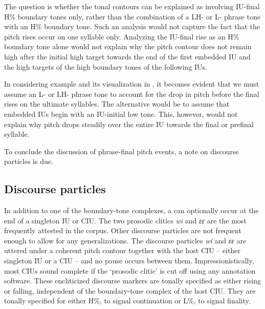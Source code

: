 The question is whether the tonal contours can be explained as involving  IU-final H\% boundary tones only, rather than the combination of a LH- or L- phrase tone with an H\% boundary tone. Such an analysis would not capture the fact that the pitch rises occur on one syllable only. Analyzing the IU-final rise as an H\% boundary tone  alone would not explain why the pitch contour does not remain high after the initial high target towards the end of the first embedded IU and the high targets of the high boundary tones of the following IUs.  

In considering example  and its visualization in  , it becomes evident that we must assume an L- or LH- phrase tone to account for the drop in pitch before the final rises on the ultimate syllables. 
The alternative would be to assume that embedded IUs begin with an IU-initial low tone. This, however, would not explain why pitch drops steadily over the entire IU towards the final or prefinal syllable. 



To conclude the discussion of phrase-final pitch events, a note on discourse particles is due.


\subsection{Discourse particles}
\label{sec:prosodic-clitics}




In addition to one of the boundary-tone complexes, a  can optionally occur at the end of a singleton IU or CIU. The two prosodic clitics \textit{wi} and \textit{ɛɛ} are the most frequently attested in the corpus. Other discourse particles are not frequent enough to allow for any generalizations. The discourse particles \textit{wi} and \textit{ɛɛ} are uttered under a coherent pitch contour together with the host CIU -- either singleton IU or a CIU -- and no pause  occurs between them.  Impressionistically, most  CIUs sound complete if the `prosodic clitic' is cut off using any annotation software. These encliticized discourse markers are tonally specified as either rising or falling, independent of the boundary-tone complex of the host CIU. They are  tonally specified for either H\%, to signal continuation or L\%, to signal finality.

